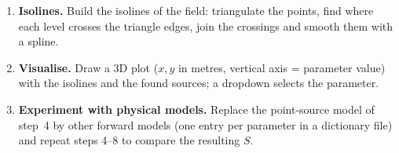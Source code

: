 \documentclass{article}
\begin{document}
\begin{enumerate}
\item \textbf{Isolines.} Build the isolines of the field: triangulate the
      points, find where each level crosses the triangle edges, join the
      crossings and smooth them with a spline.

\item \textbf{Visualise.} Draw a 3D plot ($x,y$ in metres, vertical axis =
      parameter value) with the isolines and the found sources; a dropdown
      selects the parameter.

\item \textbf{Experiment with physical models.} Replace the point-source model
      of step~4 by other forward models (one entry per parameter in a
      dictionary file) and repeat steps 4--8 to compare the resulting $S$.
\end{enumerate}
\end{document}
